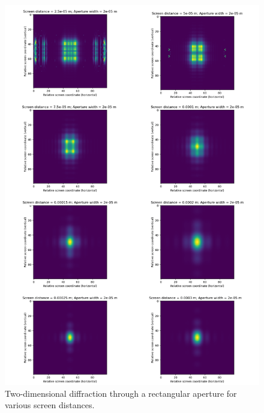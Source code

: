 \documentclass[hyphens,twocolumn,nobalancelastpage,aps,10pt,citeautoscript,longbibliography]{revtex4-2}
\begin{document}
\begin{figure}[htpb] \centering
	\includegraphics[width=1\linewidth]{./assets/rectangular_apertures/combined.png}
	\caption{Two-dimensional diffraction through a rectangular aperture for various screen distances.}%
	\label{fig:rect_ap}
\end{figure}
\end{document}
